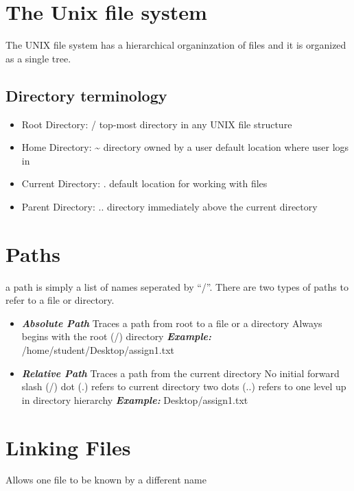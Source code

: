 \documentclass{report}
\begin{document}
  \section{The Unix file system}
  The UNIX file system has a hierarchical organinzation of files and it is organized as a single tree.
  \subsection{Directory terminology}
  \begin{itemize}
  \item Root Directory: /
    \subitem top-most directory in any UNIX file structure
  \item Home Directory: \~{}
    \subitem directory owned by a user
    \subitem default location where user logs in
  \item Current Directory: .
    \subitem default location for working with files
  \item Parent Directory: ..
    \subitem directory immediately above the current directory
  \end{itemize}    
  \section{Paths}
  a path is simply a list of names seperated by ``/''. There are two types of paths to refer to a file or directory.
  \begin{itemize}
    \item \textit{\textbf{Absolute Path}} 
    \subitem Traces a path from root to a file or a directory
     \subitem Always begins with the root (/) directory
     \subitem \textit{\textbf{Example:}} /home/student/Desktop/assign1.txt
   \item \textit{\textbf{Relative Path}}
     \subitem Traces a path from the current directory
     \subitem No initial forward slash (/)
     \subsubitem dot (.) refers to current directory
     \subsubitem two dots (..) refers to one level up in directory hierarchy
     \subitem \textit{\textbf{Example:}} Desktop/assign1.txt
  \end{itemize}
  \section{Linking Files}
  Allows one file to be known by a different name 
  \vspace{1.5mm}
\end{document}
